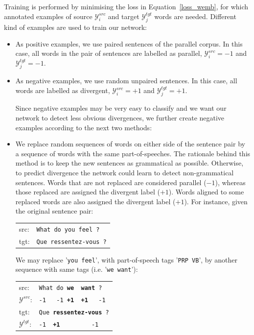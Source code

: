 \documentclass[11pt,a4paper]{article}
\begin{document}
Training is performed by minimising the loss in
Equation~\eqref{loss_wemb}, for which annotated examples of
source $\mathcal{Y}_i^{src}$ and target $\mathcal{Y}_j^{tgt}$ words
are needed. 
Different kind of examples are used to train our network:
\begin{itemize}

\item As positive examples, we use paired sentences of the parallel corpus. In this case, all words in the pair of sentences are labelled as parallel, $\mathcal{Y}_i^{src}=-1$ and $\mathcal{Y}_j^{tgt}=-1$. 

\item As negative examples, we use random unpaired sentences. In this
  case, all words are labelled as divergent, $\mathcal{Y}_i^{src}=+1$
  and $\mathcal{Y}_j^{tgt}=+1$.

Since negative examples may be very easy to classify and we want our
network to detect less obvious divergences, we further create negative
examples according to the next two methods:

\item We replace random sequences of words on either side of the sentence pair by a sequence of words with the same part-of-speeches. 
The rationale behind this method is to keep the new sentences as grammatical as possible. 
Otherwise, to predict divergence the network could learn to detect non-grammatical sentences.
Words that are not replaced are considered parallel ($-1$), whereas those replaced are assigned the divergent label ($+1$). 
Words aligned to some replaced words are also assigned the divergent label ($+1$). For instance, given the original sentence pair:

\begin{table}[h]
\center
\begin{tabular}{ll}
src: & { \small \texttt{What do you feel ?}} \\
tgt: & { \small \texttt{Que ressentez-vous ?}} \\
\end{tabular}
\end{table}

We may replace '\texttt{you feel}', with part-of-speech tags
'\texttt{PRP VB}', by another sequence with same tags (i.e. '\texttt{we want}'):

\begin{table}[h]
\center
\begin{tabular}{ll}
src: & { \small \texttt{What do {\bf we \ want} ?}} \\
$\mathcal{Y}^{src}$: & { \small \texttt{-1 \ \  -1 {\bf +1\ \ +1} \ \  -1}} \\
tgt: & { \small \texttt{Que {\bf ressentez-vous} ?}} \\
$\mathcal{Y}^{tgt}$: & { \small \texttt{-1\ \ {\bf +1}\ \ \ \ \ \ \ \ \ -1}} \\
\end{tabular}
\end{table}


\end{itemize}
\end{document}
